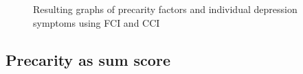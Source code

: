 \documentclass[
]{article}
\begin{document}
\begin{figure}


\caption{\label{fig-sym}Resulting graphs of precarity factors and
individual depression symptoms using FCI and CCI}

\end{figure}%

\subsection{Precarity as sum score}\label{precarity-as-sum-score}
\end{document}

